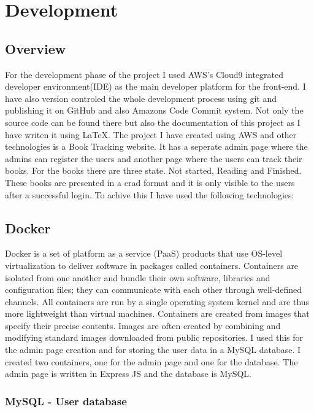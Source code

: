 \documentclass[11pt,a4paper,oneside]{report}
\begin{document}
\chapter{Development}

\section{Overview}
For the development phase of the project I used AWS's Cloud9 integrated developer environment(IDE) as the main developer platform for the front-end.
I have also version controled the whole development process using git and publishing it on GitHub and also Amazons Code Commit system. Not only the source code can be found there but also the documentation of this project as I have writen it using \LaTeX{}.
The project I have created using AWS and other technologies is a Book Tracking website. It has a seperate admin page where the admins can register the users and another page where the users can track their books.
For the books there are three state. Not started, Reading and Finished. These books are presented in a crad format and it is only visible to the users after a successful login.
To achive this I have used the following technologies:
\section{Docker}

Docker is a set of platform as a service (PaaS) products that use OS-level virtualization to deliver software in packages called containers. Containers are isolated from one another and bundle their own software, libraries and configuration files; they can communicate with each other through well-defined channels. All containers are run by a single operating system kernel and are thus more lightweight than virtual machines. Containers are created from images that specify their precise contents. Images are often created by combining and modifying standard images downloaded from public repositories.
I used this for the admin page creation and for storing the user data in a MySQL database. I created two containers, one for the admin page and one for the database. The admin page is written in Express JS and the database is MySQL.

\subsection{MySQL - User database}
\end{document}

